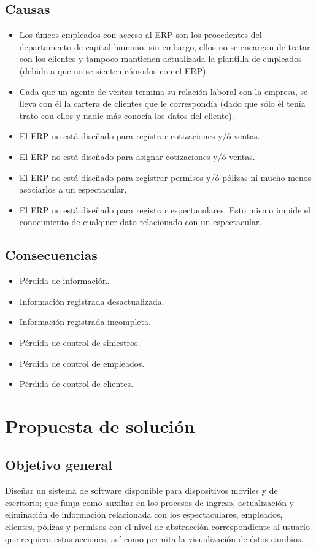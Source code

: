 \subsection{Causas}
\begin{itemize}
\item{Los únicos empleados con acceso al ERP son los procedentes del departamento de capital humano, sin embargo, ellos no se encargan de tratar con los clientes y tampoco mantienen actualizada la plantilla de empleados (debido a que no se sienten cómodos con el ERP).}
\item{Cada que un agente de ventas termina su relación laboral con la empresa, se lleva con él la cartera de clientes que le correspondía (dado que sólo él tenía trato con ellos y nadie más conocía los datos del cliente).}
\item{El ERP no está diseñado para registrar cotizaciones y/ó ventas.}
\item{El ERP no está diseñado para asignar cotizaciones y/ó ventas.}
\item{El ERP no está diseñado para registrar permisos y/ó pólizas ni mucho menos asociarlos a un espectacular.}
\item{El ERP no está diseñado para registrar espectaculares. Esto mismo impide el conocimiento de cualquier dato relacionado con un espectacular.}
\end{itemize}
\subsection{Consecuencias}
\begin{itemize}
\item{Pérdida de información.}
\item{Información registrada desactualizada.}
\item{Información registrada incompleta.}
\item{Pérdida de control de siniestros.}
\item{Pérdida de control de empleados.}
\item{Pérdida de control de clientes.}
\end{itemize}

\newpage
\section{Propuesta de solución}
\subsection{Objetivo general}
Diseñar un sistema de software disponible para dispositivos móviles y de escritorio; que funja como auxiliar en los procesos de ingreso, actualización y eliminación de información relacionada con los espectaculares, empleados, clientes, pólizas y permisos con el nivel de abstracción correspondiente al usuario que requiera estas acciones, así como permita la visualización de éstos cambios.
